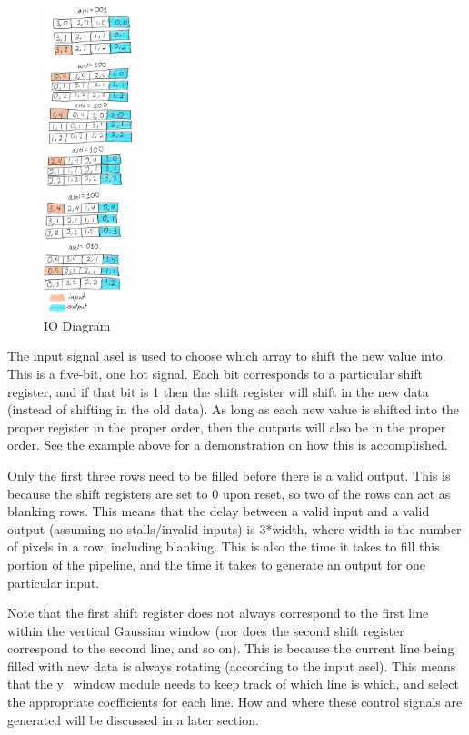 \begin{figure}
    \includegraphics[width=0.23\textwidth]{processed_image_pngs/io_diagram.png}
    \caption{IO Diagram}
    \label{fig:io}
\end{figure}


The input signal asel is used to choose which array to shift the new value into. 
This is a five-bit, one hot signal. Each bit corresponds to a particular 
shift register, and if that bit is 1 then the shift register will shift in the 
new data (instead of shifting in the old data). As long as each new value is 
shifted into the proper register in the proper order, then the outputs will also 
be in the proper order. See the example above for a demonstration on how this is 
accomplished.

Only the first three rows need to be filled before there is a valid output. This 
is because the shift registers are set to 0 upon reset, so two of the rows can 
act as blanking rows. This means that the delay between a valid input and 
a valid output (assuming no stalls/invalid inputs) is 3*width, where width is 
the number of pixels in a row, including blanking. This is also the time it 
takes to fill this portion of the pipeline, and the time it takes to generate an 
output for one particular input.

Note that the first shift register does not always correspond to the first line 
within the vertical Gaussian window (nor does the second shift register 
correspond to the second line, and so on). This is because the current line 
being filled with new data is always rotating (according to the input asel). 
This means that the y\_window module needs to keep track of which line is which, 
and select the appropriate coefficients for each line. How and where these 
control signals are generated will be discussed in a later section.


